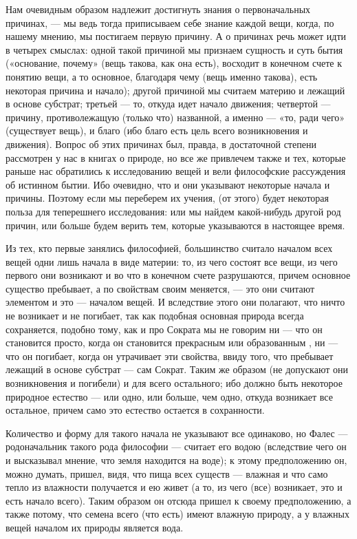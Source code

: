 \documentclass{article}
\begin{document}
Нам очевидным образом надлежит достигнуть знания о первоначальных причинах, — мы ведь тогда приписываем себе знание каждой вещи, когда, по нашему мнению, мы постигаем первую причину. А о причинах речь может идти в четырех смыслах: одной такой причиной мы признаем сущность и суть бытия («основание, почему»
\footnotemark[1]
(вещь такова, как она есть), восходит в конечном счете к понятию вещи, а то основное, благодаря чему (вещь именно такова), есть некоторая причина и начало);
\footnotemark[2]
другой причиной мы считаем материю и лежащий в основе субстрат; третьей — то, откуда идет начало движения; четвертой — причину, противолежащую (только что) названной, а именно — «то, ради чего» (существует вещь), и благо (ибо благо есть цель всего возникновения и движения). Вопрос об этих причинах был, правда, в достаточной степени рассмотрен у нас в книгах о природе, но все же привлечем также и тех, которые раньше нас обратились к исследованию вещей и вели философские рассуждения об истинном бытии. Ибо очевидно, что и они указывают некоторые начала и причины. Поэтому если мы переберем их учения, (от этого) будет некоторая польза для теперешнего исследования: или мы найдем какой-нибудь другой род причин, или больше будем верить тем, которые указываются в настоящее время.

Из тех, кто первые занялись философией, большинство считало началом всех вещей одни лишь начала в виде
\footnotemark[3]
материи: то, из чего состоят все вещи, из чего первого они возникают и во что в конечном счете разрушаются, причем основное существо пребывает, а по свойствам своим меняется, — это они считают элементом и это — началом вещей. И вследствие этого они полагают, что ничто не возникает и не погибает, так как подобная основная природа всегда сохраняется, подобно тому, как и про Сократа мы не говорим ни — что он становится просто, когда он становится прекрасным или образованным
\footnotemark[4]
, ни — что он погибает, когда он утрачивает эти свойства, ввиду того, что пребывает лежащий в основе субстрат — сам Сократ. Таким же образом (не допускают они возникновения и погибели) и для всего остального; ибо должно быть некоторое природное естество
\footnotemark[5]
— или одно, или больше, чем одно, откуда возникает все остальное, причем само это естество остается в сохранности.

Количество и форму для такого начала не указывают все одинаково, но Фалес — родоначальник такого рода философии — считает его водою (вследствие чего он и высказывал мнение, что земля находится на воде); к этому предположению он, можно думать, пришел, видя, что пища всех существ — влажная и что само тепло из влажности получается и ею живет (а то, из чего (все) возникает, это и есть начало всего). Таким образом он отсюда пришел к своему предположению, а также потому, что семена всего (что есть) имеют влажную природу, а у влажных вещей началом их природы является вода.
\end{document}
